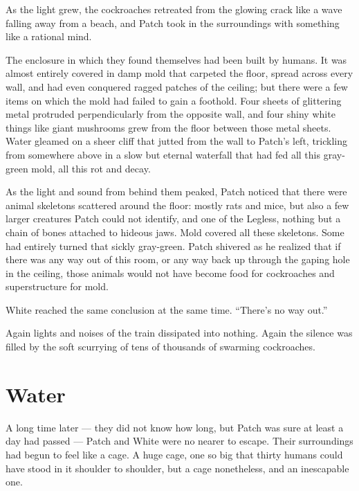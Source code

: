 \documentclass[ebook,oneside,openany,17pt]{memoir}
\newenvironment{tolerant}[1]{%
  \par\tolerance=#1\relax
}{%
  \par
}
\renewcommand{\thechapter}{\Roman{chapter}}
\newcounter{sections}
\newcommand{\sections}[1]{%
  \section*{#1}
  \addtocounter{sections}{1}%
  \pdfbookmark[1]{#1}{section.\thechapter.\thesections}}
\begin{document}
\begin{tolerant}{500}
As the light grew, the cockroach\-es retreated from the glowing crack
like a wave falling away from a beach, and Patch took in the
surroundings with something like a rational mind.
\end{tolerant}

\begin{tolerant}{500}
The enclosure in which they found themselves had been built by
humans. It was almost entirely covered in damp mold that carpeted the
floor, spread across every wall, and had even conquered ragged patches
of the ceiling; but there were a few items on which the mold had
failed to gain a foothold. Four sheets of glittering metal protruded
perpendicularly from the opposite wall, and four shiny white things
like giant mushrooms grew from the floor between those metal
sheets. Water gleamed on a sheer cliff that jutted from the wall to
Patch’s left, trickling from somewhere above in a slow but eternal
waterfall that had fed all this gray-green mold, all this rot and
decay.
\end{tolerant}

\begin{tolerant}{500}
As the light and sound from behind them peaked, Patch noticed that
there were animal skeletons scattered around the floor: mostly rats
and mice, but also a few larger creatures Patch could not identify,
and one of the Legless, nothing but a chain of bones attached to
hideous jaws. Mold covered all these skeletons. Some had entirely
turned that sickly gray-green. Patch shivered as he realized that if
there was any way out of this room, or any way back up through the
gaping hole in the ceiling, those animals would not have become food
for cockroaches and superstructure for mold.
\end{tolerant}

White reached the same conclusion at the same time. “There’s no way
out.”

Again lights and noises of the train dissipated into nothing. Again
the silence was filled by the soft scurrying of tens of thousands of
swarming cockroaches.


\sections{Water}

A long time later — they did not know how long, but Patch was sure at
least a day had passed — Patch and White were no nearer to
escape. Their surroundings had begun to feel like a cage. A huge cage,
one so big that thirty humans could have stood in it shoulder to
shoulder, but a cage nonetheless, and an inescapable one.
\end{document}
